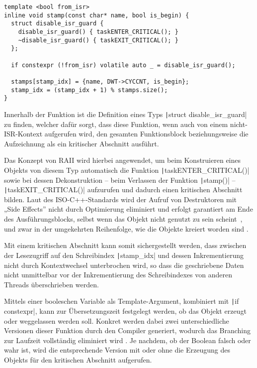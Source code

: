 \begin{code}
\begin{verbatim}
template <bool from_isr>
inline void stamp(const char* name, bool is_begin) {
  struct disable_isr_guard {
    disable_isr_guard() { taskENTER_CRITICAL(); }
    ~disable_isr_guard() { taskEXIT_CRITICAL(); }
  };

  if constexpr (!from_isr) volatile auto _ = disable_isr_guard();

  stamps[stamp_idx] = {name, DWT->CYCCNT, is_begin};
  stamp_idx = (stamp_idx + 1) % stamps.size();
}
\end{verbatim}
\end{code}

Innerhalb der Funktion ist die Definition eines Typs \texttt|struct
disable_isr_guard| zu finden, welcher dafür sorgt, dass diese Funktion, wenn
auch von einem nicht-ISR-Kontext aufgerufen wird, den gesamten Funktionsblock
beziehungsweise die Aufzeichnung als ein kritischer Abschnitt ausführt.

Das Konzept von \ac{RAII} wird hierbei angewendet, um beim Konstruieren eines
Objekts von diesem Typ automatisch die Funktion
\texttt|taskENTER_CRITICAL()| sowie bei dessen Dekonstruktion – beim
Verlassen der Funktion \texttt|stamp()| –
\texttt|taskEXIT_CRITICAL()| aufzurufen und dadurch einen kritischen
Abschnitt bilden. Laut des ISO-C++-Standards wird der Aufruf von Destruktoren
mit „Side Effects”\footnotemark{} nicht durch Optimierung eliminiert und erfolgt
garantiert am Ende des Ausführungsblocks, selbst wenn das Objekt nicht genutzt
zu sein scheint~\cite[§6.7.5.4 Abs. 3]{iso_iec_14882_2020}, und zwar in der
umgekehrten Reihenfolge, wie die Objekte kreiert worden sind
\cite{isocpp_dtor_order}.


Mit einem kritischen Abschnitt kann somit sichergestellt werden, dass zwischen
der Lesezugriff auf den Schreibindex \texttt|stamp_idx| und dessen
Inkrementierung nicht durch Kontextwechsel unterbrochen wird, so dass die
geschriebene Daten nicht unmittelbar vor der Inkrementierung des Schreibindexes
von anderen Threads überschrieben werden.

Mittels einer booleschen Variable als Template-Argument, kombiniert mit
\texttt|if constexpr|, kann zur Übersetzungszeit festgelegt werden, ob
das Objekt erzeugt oder weggelassen werden soll. Konkret werden dabei zwei
unterschiedliche Versionen dieser Funktion durch den Compiler generiert, wodurch
das Branching zur Laufzeit vollständig eliminiert wird
\cite{cppreference_constexpr_if}. Je nachdem, ob der Boolean falsch oder wahr
ist, wird die entsprechende Version mit oder ohne die Erzeugung des Objekts für
den kritischen Abschnitt aufgerufen.

